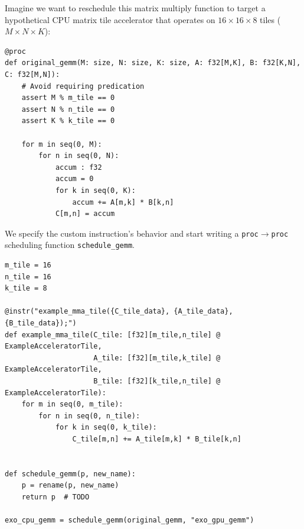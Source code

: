 \begin{minipage}[t]{0.5\textwidth}\codeminipage
Imagine we want to reschedule this matrix multiply function to target a hypothetical CPU matrix tile accelerator that operates on $16 \times 16 \times 8$ tiles ($M \times N \times K$):
\vspace{6mm}
\tiny
\begin{verbatim}
@proc
def original_gemm(M: size, N: size, K: size, A: f32[M,K], B: f32[K,N], C: f32[M,N]):
    # Avoid requiring predication
    assert M % m_tile == 0
    assert N % n_tile == 0
    assert K % k_tile == 0

    for m in seq(0, M):
        for n in seq(0, N):
            accum : f32
            accum = 0
            for k in seq(0, K):
                accum += A[m,k] * B[k,n]
            C[m,n] = accum
\end{verbatim}
\end{minipage}
\begin{minipage}[t]{0.5\textwidth}\fixminipage
\vspace{3cm}
We specify the custom instruction's behavior and start writing a \texttt{proc}$\to$\texttt{proc} scheduling function \texttt{schedule\_gemm}.
\vspace{6mm}
\tiny
\begin{verbatim}
m_tile = 16
n_tile = 16
k_tile = 8

@instr("example_mma_tile({C_tile_data}, {A_tile_data}, {B_tile_data});")
def example_mma_tile(C_tile: [f32][m_tile,n_tile] @ ExampleAcceleratorTile,
                     A_tile: [f32][m_tile,k_tile] @ ExampleAcceleratorTile,
                     B_tile: [f32][k_tile,n_tile] @ ExampleAcceleratorTile):
    for m in seq(0, m_tile):
        for n in seq(0, n_tile):
            for k in seq(0, k_tile):
                C_tile[m,n] += A_tile[m,k] * B_tile[k,n]


def schedule_gemm(p, new_name):
    p = rename(p, new_name)
    return p  # TODO

exo_cpu_gemm = schedule_gemm(original_gemm, "exo_gpu_gemm")
\end{verbatim}
\end{minipage}
\newpage
{}

